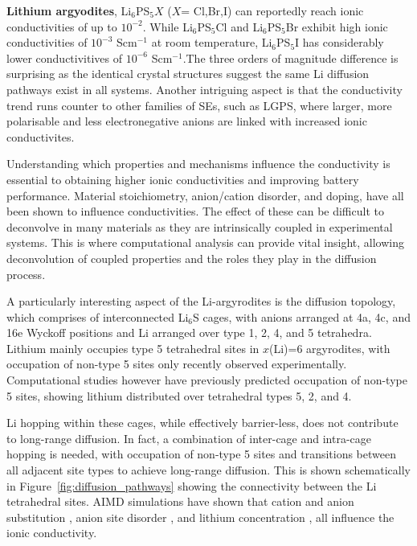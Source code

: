 \documentclass[../main.tex]{subfiles}
\begin{document}
\textbf{Lithium argyodites}, Li$_6$PS$_{5}X$ ($X$= Cl,Br,I) can reportedly reach ionic conductivities of up to $10^{-2}$. \cite{deiseroth_li6ps5x_2008} While Li$_6$PS$_{5}$Cl and Li$_6$PS$_{5}$Br exhibit high ionic conductivities of $10^{-3}$ Scm$^{-1}$ at room temperature, Li$_6$PS$_{5}$I has considerably lower conductivitives of $10^{-6}$ Scm$^{-1}$.The three orders of magnitude difference is surprising as the identical crystal structures suggest the same Li diffusion pathways exist in all systems. Another intriguing aspect is that the conductivity trend runs counter to other families of SEs, such as LGPS, where larger, more polarisable and less electronegative anions are linked with increased ionic conductivites. \cite{bachman2016inorganic}

Understanding which properties and mechanisms influence the conductivity is essential to obtaining higher ionic conductivities and improving battery performance. Material stoichiometry, anion/cation disorder, and doping, have all been shown to influence conductivities. The effect of these can be difficult to deconvolve in many materials as they are intrinsically coupled in experimental systems. This is where computational analysis can provide vital insight, allowing deconvolution of coupled properties and the roles they play in the diffusion process.

A particularly interesting aspect of the Li-argyrodites is the diffusion topology, which comprises of interconnected Li$_6$S cages, with anions arranged at 4a, 4c, and 16e Wyckoff positions and Li arranged over type 1, 2, 4, and 5 tetrahedra.\cite{kuhs1979} Lithium mainly occupies type 5 tetrahedral sites in $x$(Li)=6 argyrodites, with occupation of non-type 5 sites only recently observed experimentally. \cite{ohno2019further,gautamengineering} Computational studies however have previously predicted occupation of non-type 5 sites, showing lithium distributed over tetrahedral types 5, 2, and 4. \cite{deiseroth_li6ps5x_2008, Minafra2020, morgan2020mechanistic}

Li hopping within these cages, while effectively barrier-less, does not contribute to long-range diffusion. In fact, a combination of inter-cage and intra-cage hopping is needed, with occupation of non-type 5 sites and transitions between all adjacent site types to achieve long-range diffusion. This is shown schematically in Figure~\ref{fig:diffusion_pathways} showing the connectivity between the Li tetrahedral sites. AIMD simulations have shown that cation and anion substitution \cite{ohno2019further,deklerk2016}, anion site disorder \cite{gautamengineering,morgan2020mechanistic}, and lithium concentration \cite{Deng2017, yu_superionic_2020, Feng_2020}, all influence the ionic conductivity.
\end{document}
